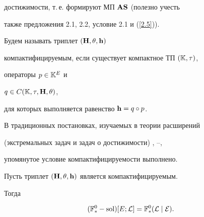 {достижимости, т.\,е. формируют МП ${\bold A}{\bold S}$ (полезно учесть


также предложения 2.1, 2.2, условие 2.1 и (\ref{2.5})).








\begin{defnnonum}


Будем называть триплет $({\bold H},\theta,{\bold h})$


компактифицируемым, если существует компактное ТП $({\Bbb K},\tau)$,


операторы $p \in {\Bbb K}^E$ и


$q \in C({\Bbb K},\tau,{\bold H},\theta)$,


для которых выполняется равенство ${\bold h} = q\circ{p}$.


\end{defnnonum}





В традиционных постановках, изучаемых в теории расширений


(экстремальных задач и задач о достижимости) \cite{2}, \cite{5}--\cite{8},


упомянутое условие компактифицируемости выполнено.








\begin{thms}


Пусть триплет $({\bold H},\theta,{\bold h})$ является компактифицируемым.


Тогда


\begin{equation}\label{3.13}


({{\Bbb F}_*^0}-\sol)[E;{\cal L}] =


{{\Bbb F}^0_*}({\cal L}\mid{\cal E}).


\end{equation}


\end{thms}








}
